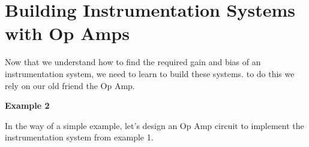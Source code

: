 \documentclass{handout}
\begin{document}

\newpage
\clearpage
\pagebreak

\section{Building Instrumentation Systems with Op Amps}
Now that we understand how to find the required gain and bias of an instrumentation system, we need to learn to build these systems.  to do this we rely on our old friend the Op Amp.  

\textbf{Example 2}

In the way of a simple example, let's design an Op Amp circuit to implement the instrumentation system from example 1.  
\end{document}
